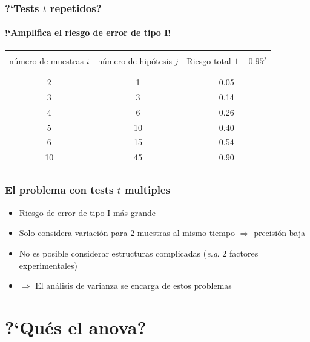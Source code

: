 \documentclass[mathserif]{beamer}
\begin{document}
\begin{frame}[label=anov4]
   \frametitle{?`Tests $t$ repetidos?}
   \framesubtitle{!`Amplifica el riesgo de error de tipo I!}

   \footnotesize

   \begin{table}
      \begin{tabular}{ccc}
         \firsthline
         \\[-0.85cm]
         \parbox[t]{13ex}{\flushleft n\'umero de muestras $i$} & \parbox[t]{13ex}{\flushleft n\'umero de hip\'otesis $j$} & \parbox[t]{13ex}{\flushleft Riesgo total $1-0.95^j$} \\
         \\[-1ex]
         \hline \\[-1ex]
         2 & 1 & 0.05 \\
         3 & 3 & 0.14 \\
         4 & 6 & 0.26 \\
         \alert{5} & \alert{10} & \alert{0.40} \\
         6 & 15 & 0.54 \\
         10 & 45 & 0.90 \\
         \lasthline
      \end{tabular}
   \end{table}
\end{frame}%


\begin{frame}[label=anov5]
   \frametitle{El problema con tests $t$ multiples}
    \begin{itemize}
      \item Riesgo de error de tipo I m\'as grande
      \item Solo considera variaci\'on para 2 muestras al mismo tiempo $\Rightarrow$ precisi\'on baja
      \item No es posible considerar estructuras complicadas (\emph{e.g.} 2 factores experimentales)
      \medskip
      \item[ ] $\Rightarrow$ El an\'alisis de varianza se encarga de estos problemas
   \end{itemize}
\end{frame}%



\section[Definici\'on]{?`Qu\' es el anova?}
\end{document}
